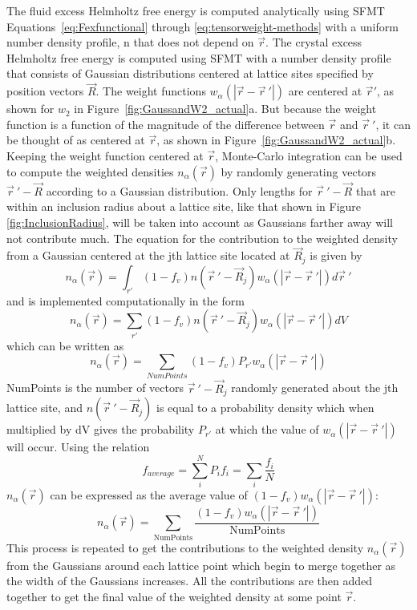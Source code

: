 \documentclass[double,12pt]{beavtex}
\begin{document}
The fluid excess Helmholtz free energy is computed analytically  
using SFMT Equations~\ref{eq:Fexfunctional} through \ref{eq:tensorweight-methods} 
with a uniform number density profile, n that does not depend on $\vec r$. 
The crystal excess Helmholtz free energy is computed  
using SFMT with a number density profile 
that consists of Gaussian distributions 
centered at lattice sites specified by position vectors $\vec R$. 
The weight functions $w_\alpha(|\vec r - \vec r~'|)$ are centered at $\vec r'$,
as shown for $w_2$ in Figure~\ref{fig:GaussandW2_actual}a. 
But because the weight function is a function of the magnitude of the 
difference between $\vec r$ and $\vec r~'$, it can be thought of as 
centered at $\vec r$, as shown in Figure~\ref{fig:GaussandW2_actual}b.
Keeping the weight function centered at $\vec r$, 
Monte-Carlo integration can be used to compute the weighted densities $n_\alpha(\vec r)$
by randomly generating vectors
$\vec r~' -\vec R$ according to a Gaussian distribution. 
Only lengths for $\vec r~'- \vec R$ that are within an inclusion radius
about a lattice site, like that shown in Figure \ref{fig:InclusionRadius}, 
will be taken into account as Gaussians 
farther away will not contribute much.
The equation for the contribution to the weighted density from a 
Gaussian centered at the jth lattice site located at $\vec R_j$ is given by
\begin{equation}{n_\alpha(\vec r)= \int_{r'}{(1-f_v)n(\vec r~' - \vec R_j)w_\alpha(|\vec{r}-\vec{r}~'|)} {d}\vec{r}~'}\end{equation} 
and is implemented computationally in the form
\begin{equation}{n_\alpha(\vec r)= \sum_{r'}{(1-f_v)n(\vec r~' -\vec R_j)w_\alpha(|\vec{r}-\vec{r}~'|)dV}}\end{equation} 
which can be written as
\begin{equation}{n_\alpha(\vec r)= \sum_{NumPoints}(1-f_v)P_{r'}w_\alpha(|\vec{r}-\vec{r}~'|)}\end{equation} 
NumPoints is the number of vectors $\vec r~' - \vec R_j$ randomly 
generated about the jth lattice site, and $n(\vec r~' - \vec R_j)$
is equal to a probability density which when multiplied by dV gives 
the probability $P_{r'}$ at which the value of $w_\alpha(|\vec{r}-\vec{r}~'|)$ 
will occur. Using the relation
\begin{equation}{f_{average}=\sum_i^N{P_if_i}=\sum_i{\frac{f_i}{N}}}\end{equation} 
$n_\alpha(\vec{r})$ can be expressed as the average value of $(1-f_v)w_\alpha(|\vec{r}-\vec{r}~'|)$:
\begin{equation}{n_\alpha(\vec{r})=\sum_{\text{NumPoints}}\frac{(1-f_v)w_\alpha(|\vec{r}-\vec{r}~'|)}{\text{NumPoints}}}\end{equation}
This process is repeated to get the contributions to the weighted density 
$n_\alpha(\vec r)$ from the Gaussians around each lattice point which begin to 
merge together as the width of the Gaussians increases.
All the contributions are then added together 
to get the final value of the weighted density at some point $\vec r$.
\end{document}
